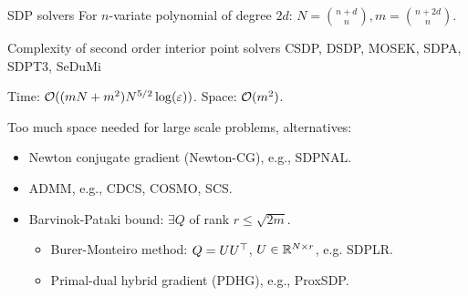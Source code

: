\begin{frame}{SDP solvers}
  For $n$-variate polynomial of degree $2d$:
  $N = {n + d \choose n}, m = {n + 2d \choose n}$.
  \begin{block}{Complexity of second order interior point solvers}
    CSDP, DSDP, MOSEK, SDPA, SDPT3, SeDuMi

    Time:
    $\mathcal{O}((mN + m^2)N^{5/2}\log(\varepsilon))$.
    Space:
    $\mathcal{O}(m^2)$.
  \end{block}
  Too much space needed for large scale problems, alternatives:
  \begin{itemize}
    \item
    Newton conjugate gradient (Newton-CG), e.g., SDPNAL.
    \item
    ADMM, e.g., CDCS, COSMO, SCS.
    \item
    Barvinok-Pataki bound: $\exists Q$ of rank $r \le \sqrt{2m}$.
  \begin{itemize}
    \item
    Burer-Monteiro method: $Q = UU^\top$, $U \in \mathbb{R}^{N \times r}$, e.g. SDPLR.
    \item
    Primal-dual hybrid gradient (PDHG), e.g., ProxSDP.
  \end{itemize}
  \end{itemize}
\end{frame}

